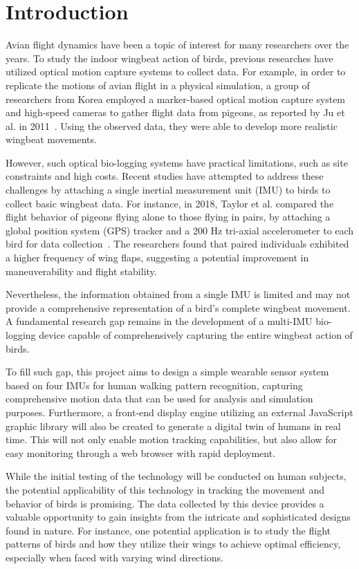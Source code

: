 \chapter{Introduction}
Avian flight dynamics have been a topic of interest for many researchers over the years.
To study the indoor wingbeat action of birds, previous researches have utilized optical motion capture systems to collect data.
For example, in order to replicate the motions of avian flight in a physical simulation, a group of researchers from Korea employed a marker-based optical motion capture system and high-speed cameras to gather flight data from pigeons, as reported by Ju et al.
in 2011~\cite{ju_data-driven_2011}.
Using the observed data, they were able to develop more realistic wingbeat movements.

However, such optical bio-logging systems have practical limitations, such as site constraints and high costs.
Recent studies have attempted to address these challenges by attaching a single inertial measurement unit (IMU) to birds to collect basic wingbeat data.
For instance, in 2018, Taylor et al.
compared the flight behavior of pigeons flying alone to those flying in pairs, by attaching a global position system (GPS) tracker and a 200 Hz tri-axial accelerometer to each bird for data collection~\cite{taylor_birds_2019}.
The researchers found that paired individuals exhibited a higher frequency of wing flaps, suggesting a potential improvement in maneuverability and flight stability.

Nevertheless, the information obtained from a single IMU is limited and may not provide a comprehensive representation of a bird's complete wingbeat movement.
A fundamental research gap remains in the development of a multi-IMU bio-logging device capable of comprehensively capturing the entire wingbeat action of birds.

To fill such gap, this project aims to design a simple wearable sensor system based on four IMUs for human walking pattern recognition, capturing comprehensive motion data that can be used for analysis and simulation purposes.
Furthermore, a front-end display engine utilizing an external JavaScript graphic library will also be created to generate a digital twin of humans in real time.
This will not only enable motion tracking capabilities, but also allow for easy monitoring through a web browser with rapid deployment.

While the initial testing of the technology will be conducted on human subjects, the potential applicability of this technology in tracking the movement and behavior of birds is promising. The data collected by this device provides a valuable opportunity to gain insights from the intricate and sophisticated designs found in nature. For instance, one potential application is to study the flight patterns of birds and how they utilize their wings to achieve optimal efficiency, especially when faced with varying wind directions.

